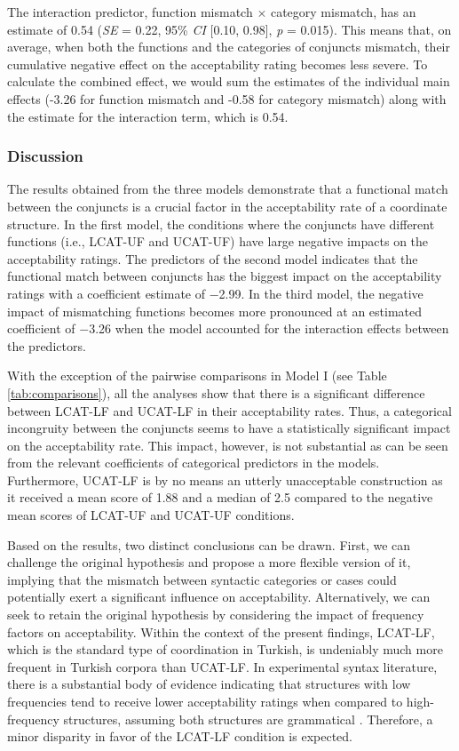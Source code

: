 The interaction predictor, function mismatch $\times$ category mismatch, has an estimate of 0.54 (\textit{SE} = 0.22, 95\% \textit{CI} [0.10, 0.98], \textit{p} = 0.015). This means that, on average, when both the functions and the categories of conjuncts mismatch, their cumulative negative effect on the acceptability rating becomes less severe. To calculate the combined effect, we would sum the estimates of the individual main effects (-3.26 for function mismatch and -0.58 for category mismatch) along with the estimate for the interaction term, which is 0.54.


\subsubsection{Discussion}

The results obtained from the three models demonstrate that a functional match between the conjuncts is a crucial factor in the acceptability rate of a coordinate structure. In the first model, the conditions where the conjuncts have different functions (i.e., LCAT-UF and UCAT-UF) have large negative impacts on the acceptability ratings. The predictors of the second model indicates that the functional match between conjuncts has the biggest impact on the acceptability ratings with a coefficient estimate of $-$2.99. In the third model, the negative impact of mismatching functions becomes more pronounced at an estimated coefficient of $-$3.26 when the model accounted for the interaction effects between the predictors.

With the exception of the pairwise comparisons in Model I (see Table \ref{tab:comparisons}), all the analyses show that there is a significant difference between LCAT-LF and UCAT-LF in their acceptability rates. Thus, a categorical incongruity between the conjuncts seems to have a statistically significant impact on the acceptability rate. This impact, however, is not substantial as can be seen from the relevant coefficients of categorical predictors in the models. Furthermore, UCAT-LF is by no means an utterly unacceptable construction as it received a mean score of 1.88 and a median of 2.5 compared to the negative mean scores of LCAT-UF and UCAT-UF conditions. 

Based on the results, two distinct conclusions can be drawn. First, we can challenge the original hypothesis and propose a more flexible version of it, implying that the mismatch between syntactic categories or cases could potentially exert a significant influence on acceptability. Alternatively, we can seek to retain the original hypothesis by considering the impact of frequency factors on acceptability. Within the context of the present findings, LCAT-LF, which is the standard type of coordination in Turkish, is undeniably much more frequent in Turkish corpora than UCAT-LF. In experimental syntax literature, there is a substantial body of evidence indicating that structures with low frequencies tend to receive lower acceptability ratings when compared to high-frequency structures, assuming both structures are grammatical \citep{Bresnan2007, Divjak2016, Francis2021}. Therefore, a minor disparity in favor of the LCAT-LF condition is expected.

